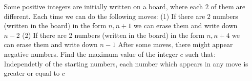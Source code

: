 Some positive integers are initially written on a board, where each $2$ of them are different.
Each time we can do the following moves:
(1) If there are 2 numbers (written in the board) in the form $n, n+1$ we can erase them and write down $n-2$
(2) If there are 2 numbers (written in the board) in the form $n, n+4$ we can erase them and write down $n-1$
After some moves, there might appear negative numbers. Find the maximum value of the integer $c$ such that:
Independetly of the starting numbers, each number which appears in any move is greater or equal to $c$
